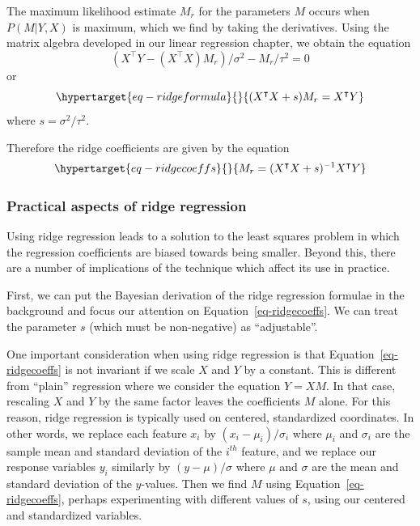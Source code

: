 \documentclass[
  11pt,
  letterpaper,
]{scrbook}
\theoremstyle{plain}
\theoremstyle{plain}
\theoremstyle{remark}
\begin{document}
The maximum likelihood estimate \(M_{r}\) for the parameters \(M\)
occurs when \(P(M|Y,X)\) is maximum, which we find by taking the
derivatives. Using the matrix algebra developed in our linear regression
chapter, we obtain the equation \[
(X^{\intercal}Y-(X^{\intercal}X)M_r)/\sigma^2-M_r/\tau^{2}=0
\] or \begin{equation}\protect\hypertarget{eq-ridgeformula}{}{
(X^{\intercal}X+s)M_r=X^{\intercal}Y
}\label{eq-ridgeformula}\end{equation} where \(s=\sigma^2/\tau^2\).

Therefore the ridge coefficients are given by the equation
\begin{equation}\protect\hypertarget{eq-ridgecoeffs}{}{
M_{r}=(X^{\intercal}X+s)^{-1}X^{\intercal}Y
}\label{eq-ridgecoeffs}\end{equation}

\hypertarget{practical-aspects-of-ridge-regression}{%
\subsubsection{Practical aspects of ridge
regression}\label{practical-aspects-of-ridge-regression}}

Using ridge regression leads to a solution to the least squares problem
in which the regression coefficients are biased towards being smaller.
Beyond this, there are a number of implications of the technique which
affect its use in practice.

First, we can put the Bayesian derivation of the ridge regression
formulae in the background and focus our attention on
Equation~\ref{eq-ridgecoeffs}. We can treat the parameter \(s\) (which
must be non-negative) as ``adjustable''.

One important consideration when using ridge regression is that
Equation~\ref{eq-ridgecoeffs} is not invariant if we scale \(X\) and
\(Y\) by a constant. This is different from ``plain'' regression where
we consider the equation \(Y=XM\). In that case, rescaling \(X\) and
\(Y\) by the same factor leaves the coefficients \(M\) alone. For this
reason, ridge regression is typically used on centered, standardized
coordinates. In other words, we replace each feature \(x_i\) by
\((x_i-\mu_i)/\sigma_i\) where \(\mu_i\) and \(\sigma_i\) are the sample
mean and standard deviation of the \(i^{th}\) feature, and we replace
our response variables \(y_i\) similarly by \((y-\mu)/\sigma\) where
\(\mu\) and \(\sigma\) are the mean and standard deviation of the
\(y\)-values. Then we find \(M\) using Equation~\ref{eq-ridgecoeffs},
perhaps experimenting with different values of \(s\), using our centered
and standardized variables.
\end{document}
